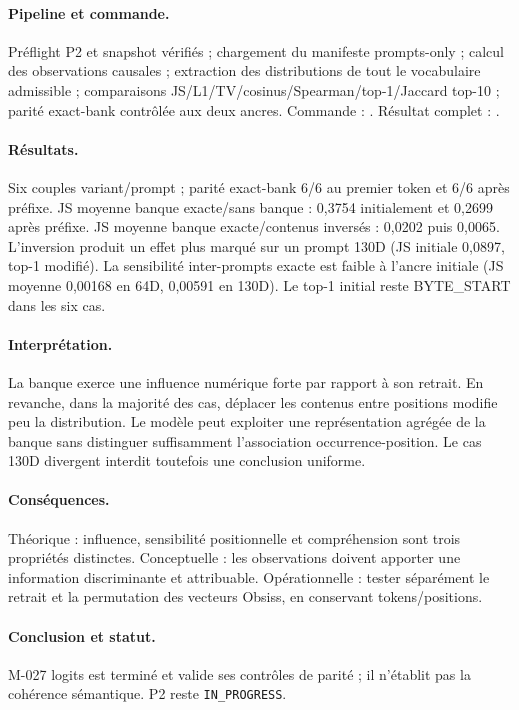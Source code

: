\documentclass[11pt,a4paper]{report}
\begin{document}
\paragraph{Pipeline et commande.} Préflight P2 et snapshot vérifiés ; chargement du manifeste prompts-only ; calcul des observations causales ; extraction des distributions de tout le vocabulaire admissible ; comparaisons JS/L1/TV/cosinus/Spearman/top-1/Jaccard top-10 ; parité exact-bank contrôlée aux deux ancres. Commande : . Résultat complet : .
\paragraph{Résultats.} Six couples variant/prompt ; parité exact-bank 6/6 au premier token et 6/6 après préfixe. JS moyenne banque exacte/sans banque : 0,3754 initialement et 0,2699 après préfixe. JS moyenne banque exacte/contenus inversés : 0,0202 puis 0,0065. L'inversion produit un effet plus marqué sur un prompt 130D (JS initiale 0,0897, top-1 modifié). La sensibilité inter-prompts exacte est faible à l'ancre initiale (JS moyenne 0,00168 en 64D, 0,00591 en 130D). Le top-1 initial reste BYTE\_START dans les six cas.
\paragraph{Interprétation.} La banque exerce une influence numérique forte par rapport à son retrait. En revanche, dans la majorité des cas, déplacer les contenus entre positions modifie peu la distribution. Le modèle peut exploiter une représentation agrégée de la banque sans distinguer suffisamment l'association occurrence-position. Le cas 130D divergent interdit toutefois une conclusion uniforme.
\paragraph{Conséquences.} Théorique : influence, sensibilité positionnelle et compréhension sont trois propriétés distinctes. Conceptuelle : les observations doivent apporter une information discriminante et attribuable. Opérationnelle : tester séparément le retrait et la permutation des vecteurs Obsiss, en conservant tokens/positions.
\paragraph{Conclusion et statut.} M-027 logits est terminé et valide ses contrôles de parité ; il n'établit pas la cohérence sémantique. P2 reste \texttt{IN\_PROGRESS}.
\end{document}
